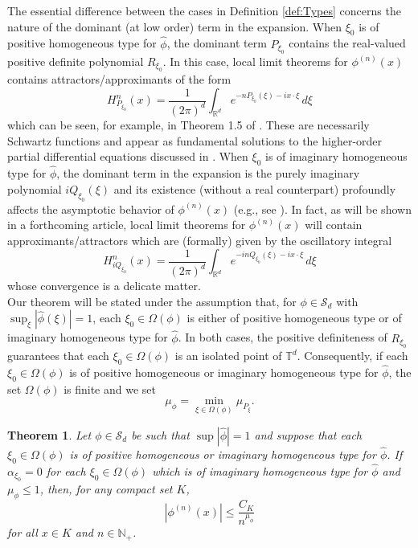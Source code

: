 \documentclass[11pt]{article}
\newtheorem{theorem}{Theorem}[section]
\theoremstyle{remark}
\begin{document}
\noindent The essential difference between the cases in Definition \ref{def:Types} 
concerns the nature of the dominant (at low order) term in the expansion. When $\xi_0$ is of positive homogeneous type for $\widehat{\phi}$, the dominant term $P_{\xi_0}$ contains the real-valued positive definite polynomial $R_{\xi_0}$. In this case, local limit theorems for $\phi^{(n)}(x)$ contains attractors/approximants of the form
\begin{equation*}
    H^n_{P_{\xi_0}}(x)=\frac{1}{(2\pi)^d}\int_{\mathbb{R}^d}e^{-nP_{\xi_0}(\xi)-ix\cdot\xi}\,d\xi
\end{equation*}
which can be seen, for example, in Theorem 1.5 of \cite{randles_convolution_2017}. These are necessarily Schwartz functions and appear as fundamental solutions to the higher-order partial differential equations discussed in \cite{randles_positive-homogeneous_2017}. When $\xi_0$ is of imaginary homogeneous type for $\widehat{\phi}$, the dominant term in the expansion is the purely imaginary polynomial $iQ_{\xi_0}(\xi)$ and its existence (without a real counterpart) profoundly affects the asymptotic behavior of $\phi^{(n)}(x)$ (e.g., see \cite{randles_convolution_2015}). In fact, as will be shown in a forthcoming article, local limit theorems for $\phi^{(n)}(x)$ will contain approximants/attractors which are (formally) given by the oscillatory integral
\begin{equation*}
    H_{iQ_{\xi_0}}^{n}(x)=\frac{1}{(2\pi)^d}\int_{\mathbb{R}^d}e^{-inQ_{\xi_0}(\xi)-ix\cdot \xi}\,d\xi
\end{equation*}
whose convergence is a delicate matter.\\






\noindent Our theorem will be stated under the assumption that, for $\phi\in\mathcal{S}_d$ with $\sup_\xi|\widehat{\phi}(\xi)|=1$, each $\xi_0\in\Omega(\phi)$ is either of positive homogeneous type or of imaginary homogeneous type for $\widehat{\phi}$. In both cases, the positive definiteness of $R_{\xi_0}$ guarantees that each $\xi_0\in\Omega(\phi)$ is an isolated point of $\mathbb{T}^d$. Consequently, if each $\xi_0\in\Omega(\phi)$ is of positive homogeneous or imaginary homogeneous type for $\widehat{\phi}$, the set $\Omega(\phi)$ is finite and we set
\begin{equation*}
    \mu_{\phi}=\min_{\xi\in\Omega(\phi)}\mu_{P_\xi}.
\end{equation*}

\begin{theorem}\label{thm:ConvolutionPowerEstimate}
Let $\phi\in\mathcal{S}_d$ be such that $\sup |\widehat{\phi}|=1$ and suppose that each $\xi_0\in\Omega(\phi)$ is of positive homogeneous or imaginary homogeneous type for $\widehat{\phi}$. If $\alpha_{\xi_0}=0$ for each $\xi_0\in\Omega(\phi)$ which is of imaginary homogeneous type for $\widehat{\phi}$ and $\mu_{\phi}\leq 1$, then, for any compact set $K$, 
\begin{equation*}
    \left|\phi^{(n)}(x)\right|\leq\frac{C_K}{n^{\mu_\phi}}
\end{equation*}
for all $x\in K$ and $n\in\mathbb{N}_+$.
\end{theorem}
\end{document}
